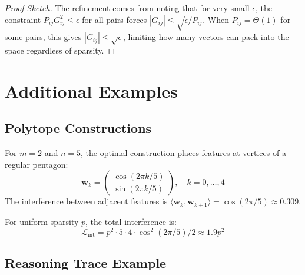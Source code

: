 \begin{proof}[Proof Sketch]
The refinement comes from noting that for very small $\epsilon$, the constraint $P_{ij} G_{ij}^2 \leq \epsilon$ for all pairs forces $|G_{ij}| \leq \sqrt{\epsilon / P_{ij}}$. When $P_{ij} = \Theta(1)$ for some pairs, this gives $|G_{ij}| \leq \sqrt{\epsilon}$, limiting how many vectors can pack into the space regardless of sparsity.
\end{proof}

\section{Additional Examples}
\label{app:examples}

\subsection{Polytope Constructions}

\begin{example}[Pentagon in 2D]
For $m = 2$ and $n = 5$, the optimal construction places features at vertices of a regular pentagon:
\begin{equation}
\mathbf{w}_k = \begin{pmatrix} \cos(2\pi k / 5) \\ \sin(2\pi k / 5) \end{pmatrix}, \quad k = 0, \ldots, 4
\end{equation}
The interference between adjacent features is $\langle \mathbf{w}_k, \mathbf{w}_{k+1} \rangle = \cos(2\pi/5) \approx 0.309$.

For uniform sparsity $p$, the total interference is:
\begin{equation}
\mathcal{L}_{\text{int}} = p^2 \cdot 5 \cdot 4 \cdot \cos^2(2\pi/5) / 2 \approx 1.9 p^2
\end{equation}
\end{example}

\subsection{Reasoning Trace Example}

